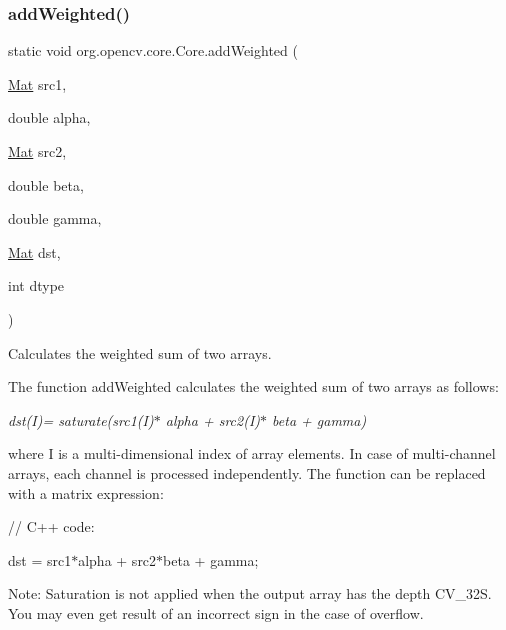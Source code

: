\subsubsection{\texorpdfstring{add\+Weighted()}{addWeighted()}\hspace{0.1cm}{\footnotesize\ttfamily [1/2]}}
{\footnotesize\ttfamily static void org.\+opencv.\+core.\+Core.\+add\+Weighted (\begin{DoxyParamCaption}\item[{\mbox{\hyperlink{classorg_1_1opencv_1_1core_1_1_mat}{Mat}}}]{src1,  }\item[{double}]{alpha,  }\item[{\mbox{\hyperlink{classorg_1_1opencv_1_1core_1_1_mat}{Mat}}}]{src2,  }\item[{double}]{beta,  }\item[{double}]{gamma,  }\item[{\mbox{\hyperlink{classorg_1_1opencv_1_1core_1_1_mat}{Mat}}}]{dst,  }\item[{int}]{dtype }\end{DoxyParamCaption})\hspace{0.3cm}{\ttfamily [static]}}

Calculates the weighted sum of two arrays.

The function {\ttfamily add\+Weighted} calculates the weighted sum of two arrays as follows\+:

{\itshape dst(\+I)= saturate(src1(\+I)$\ast$ alpha + src2(\+I)$\ast$ beta + gamma)}

where {\ttfamily I} is a multi-\/dimensional index of array elements. In case of multi-\/channel arrays, each channel is processed independently. The function can be replaced with a matrix expression\+: {\ttfamily }

{\ttfamily }

{\ttfamily }

{\ttfamily // C++ code\+:}

{\ttfamily }

{\ttfamily }

{\ttfamily dst = src1$\ast$alpha + src2$\ast$beta + gamma;}

{\ttfamily }

{\ttfamily }

{\ttfamily Note\+: Saturation is not applied when the output array has the depth {\ttfamily C\+V\+\_\+32S}. You may even get result of an incorrect sign in the case of overflow. }


